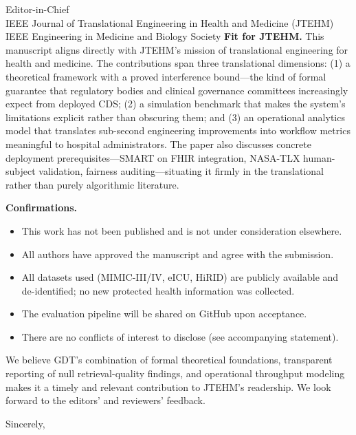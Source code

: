 \documentclass[11pt]{letter}
\begin{document}
\begin{letter}{
  Editor-in-Chief \\
  IEEE Journal of Translational Engineering in Health and Medicine (JTEHM) \\
  IEEE Engineering in Medicine and Biology Society
}
\textbf{Fit for JTEHM.} This manuscript aligns directly with JTEHM's mission of
translational engineering for health and medicine. The contributions span three
translational dimensions: (1) a theoretical framework with a proved interference
bound---the kind of formal guarantee that regulatory bodies and clinical governance
committees increasingly expect from deployed CDS; (2) a simulation benchmark that
makes the system's limitations explicit rather than obscuring them; and (3) an
operational analytics model that translates sub-second engineering improvements
into workflow metrics meaningful to hospital administrators. The paper also
discusses concrete deployment prerequisites---SMART on FHIR integration,
NASA-TLX human-subject validation, fairness auditing---situating it firmly in the
translational rather than purely algorithmic literature.

\textbf{Confirmations.}
\begin{itemize}
  \item This work has not been published and is not under consideration elsewhere.
  \item All authors have approved the manuscript and agree with the submission.
  \item All datasets used (MIMIC-III/IV, eICU, HiRID) are publicly available and
        de-identified; no new protected health information was collected.
  \item The evaluation pipeline will be shared on GitHub upon acceptance.
  \item There are no conflicts of interest to disclose (see accompanying statement).
\end{itemize}

We believe GDT's combination of formal theoretical foundations, transparent
reporting of null retrieval-quality findings, and operational throughput modeling
makes it a timely and relevant contribution to JTEHM's readership. We look forward
to the editors' and reviewers' feedback.

\closing{Sincerely,}

\end{letter}
\end{document}
